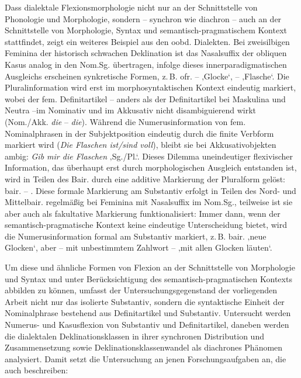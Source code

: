 Dass dialektale Flexionsmorphologie nicht nur an der Schnittstelle von Phonologie und Morphologie, sondern -- synchron wie diachron -- auch an der Schnittstelle von Morphologie, Syntax und semantisch-pragmatischem Kontext stattfindet, zeigt ein weiteres Beispiel aus den oobd. Dialekten. Bei zweisilbigen Feminina der historisch schwachen Deklination ist das Nasalsuffix der obliquen Kasus analog in den Nom.Sg. übertragen, infolge dieses innerparadigmatischen Ausgleichs erscheinen synkretische Formen, z.\,B. ofr.  --  ‚Glocke‘,  --  ‚Flasche‘. Die Pluralinformation wird erst im morphosyntaktischen Kontext eindeutig markiert, wobei der fem. Definitartikel -- anders als der Definitartikel bei Maskulina und Neutra --im Nominativ und im Akkusativ nicht dis\-ambiguierend wirkt (Nom./Akk. \textit{die} -- \textit{die}). Während die Numerusinformation von fem. Nominalphrasen in der Subjektposition eindeutig durch die finite Verbform markiert wird (\textit{Die Flaschen ist/sind voll}), bleibt sie bei Akkusativobjekten ambig: \textit{Gib mir die Flaschen} ‚Sg./Pl.‘. Dieses Dilemma uneindeutiger flexivischer Information, das überhaupt erst durch morphologischen Ausgleich entstanden ist, wird in Teilen des Bair. durch eine additive Markierung der Pluralform gelöst: bair.  -- . Diese formale Markierung am Substantiv erfolgt in Teilen des Nord- und Mittelbair. regelmäßig bei Feminina mit Nasalsuffix im Nom.Sg., teilweise ist sie aber auch als fakultative Markierung funktionalisiert: Immer dann, wenn der semantisch-pragmatische Kontext keine eindeutige Unterscheidung bietet, wird die Numerusinformation formal am Substantiv markiert, z.\,B. bair.   ‚neue Glocken‘, aber -- mit unbestimmtem Zahlwort --     ‚mit allen Glocken läuten‘.

Um diese und ähnliche Formen von Flexion an der Schnittstelle von Morphologie und Syntax und unter Berücksichtigung des semantisch-pragmatischen Kontexts abbilden zu können, umfasst der Untersuchungsgegenstand der vorliegenden Arbeit nicht nur das isolierte Substantiv, sondern die syntaktische Einheit der Nominalphrase bestehend aus Definitartikel und Substantiv. Untersucht werden Numerus- und Kasusflexion von Substantiv und Definitartikel, daneben werden die dialektalen Deklinationsklassen in ihrer synchronen Distribution und Zusammensetzung sowie Deklinationsklassenwandel als diachrones Phänomen analysiert. Damit setzt die Untersuchung an jenen Forschungsaufgaben an, die auch \citet[35]{SchmidtEtAl2019} beschreiben:\pagebreak

